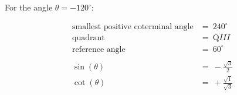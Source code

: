 For the angle $\theta = -120^{\circ}$:

$$
\begin{align*}
  \text{smallest positive coterminal angle} &=\ 240^{\circ} \\
  \text{quadrant} &=\ \text{Q}III \\
  \text{reference angle} &=\ 60^{\circ} \\
  \\
  \sin(\theta) &=\ -\frac{\sqrt{3}}{2} \\
  \cot(\theta) &=\ +\frac{\sqrt{1}}{\sqrt{3}}
\end{align*}
$$
